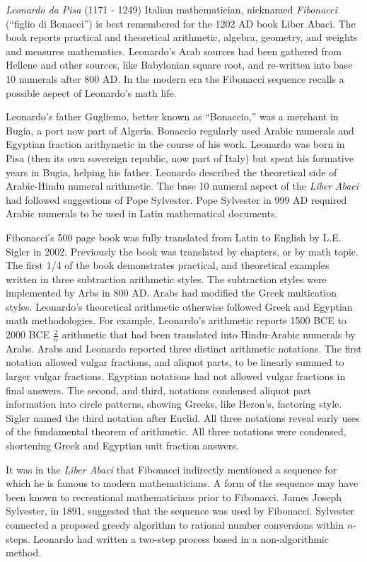 \documentclass[12pt]{article}
\begin{document}
\emph{Leonardo da Pisa} (1171 - 1249) Italian mathematician, nicknamed \emph{Fibonacci} (``figlio di Bonacci'') is best remembered for the 1202 AD book Liber Abaci. The book reports practical and theoretical arithmetic, algebra, geometry, and weights and measures mathematics. Leonardo's Arab sources had been gathered from Hellene and other sources, like Babylonian square root, and re-written into base 10 numerals after 800 AD. In the modern era the Fibonacci sequence recalls a possible aspect of Leonardo's math life.

Leonardo's father Gugliemo, better known as ``Bonaccio,'' was a merchant in Bugia, a port now part of Algeria. Bonaccio regularly used Arabic numerals and Egyptian fraction arithymetic in the course of his work. Leonardo was born in Pisa (then its own sovereign republic, now part of Italy) but spent his formative years in Bugia, helping his father. Leonardo described the theoretical side of Arabic-Hindu numeral arithmetic. The base 10 numeral aspect of the {\it Liber Abaci} had followed suggestions of Pope Sylvester. Pope Sylvester in 999 AD required Arabic numerals to be used in Latin mathematical documents. 

Fibonacci's 500 page book was fully translated from Latin to English by L.E. Sigler in 2002. Previously the book was translated by chapters, or by math topic. The first 1/4 of the book demonstrates practical, and theoretical examples written in three subtraction arithmetic styles. The subtraction styles were implemented by Arbs in 800 AD. Arabs had modified the Greek multication styles. Leonardo's theoretical arithmetic otherwise followed Greek and Egyptian math methodologies. For example, Leonardo's arithmetic reports 1500 BCE to 2000 BCE $\frac{2}{n}$ arithmetic that had been translated into Hindu-Arabic numerals by Arabs. Arabs and Leonardo reported three distinct arithmetic notations. The first notation allowed vulgar fractions, and aliquot parts, to be linearly summed to larger vulgar fractions. Egyptian notations had not allowed vulgar fractions in final answers. The second, and third, notations condensed aliquot part information into circle patterns, showing Greeks, like Heron's, factoring style. Sigler named the third notation after Euclid. All three notations reveal early uses of the fundamental theorem of arithmetic. All three notations were condensed, shortening Greek and Egyptian unit fraction answers.

It was in the {\it Liber Abaci} that Fibonacci indirectly mentioned a sequence for which he is famous to modern mathematicians. A form of the sequence may have been known to recreational mathematicians prior to Fibonacci. James Joseph Sylvester, in 1891, suggested that the sequence was used by Fibonacci. Sylvester connected a proposed greedy algorithm to rational number conversions within $n$-steps. Leonardo had written a two-step process based in a non-algorithmic method.
\end{document}
